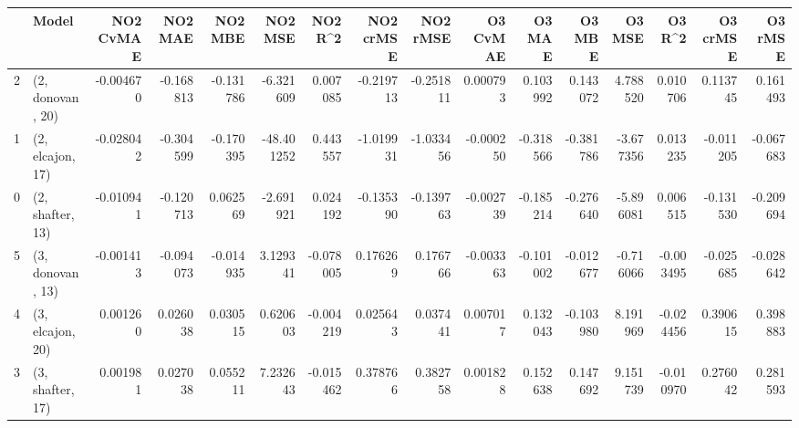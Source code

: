 \begin{tabular}{llrrrrrrrrrrrrrr}
\toprule
{} &             Model &  NO2 CvMAE &   NO2 MAE &   NO2 MBE &    NO2 MSE &   NO2 R\textasciicircum2 &  NO2 crMSE &  NO2 rMSE &  O3 CvMAE &    O3 MAE &    O3 MBE &    O3 MSE &    O3 R\textasciicircum2 &  O3 crMSE &   O3 rMSE \\
\midrule
2 &  (2, donovan, 20) &  -0.004670 & -0.168813 & -0.131786 &  -6.321609 &  0.007085 &  -0.219713 & -0.251811 &  0.000793 &  0.103992 &  0.143072 &  4.788520 &  0.010706 &  0.113745 &  0.161493 \\
1 &  (2, elcajon, 17) &  -0.028042 & -0.304599 & -0.170395 & -48.401252 &  0.443557 &  -1.019931 & -1.033456 & -0.000250 & -0.318566 & -0.381786 & -3.677356 &  0.013235 & -0.011205 & -0.067683 \\
0 &  (2, shafter, 13) &  -0.010941 & -0.120713 &  0.062569 &  -2.691921 &  0.024192 &  -0.135390 & -0.139763 & -0.002739 & -0.185214 & -0.276640 & -5.896081 &  0.006515 & -0.131530 & -0.209694 \\
5 &  (3, donovan, 13) &  -0.001413 & -0.094073 & -0.014935 &   3.129341 & -0.078005 &   0.176269 &  0.176766 & -0.003363 & -0.101002 & -0.012677 & -0.716066 & -0.003495 & -0.025685 & -0.028642 \\
4 &  (3, elcajon, 20) &   0.001260 &  0.026038 &  0.030515 &   0.620603 & -0.004219 &   0.025643 &  0.037441 &  0.007017 &  0.132043 & -0.103980 &  8.191969 & -0.024456 &  0.390615 &  0.398883 \\
3 &  (3, shafter, 17) &   0.001981 &  0.027038 &  0.055211 &   7.232643 & -0.015462 &   0.378766 &  0.382758 &  0.001828 &  0.152638 &  0.147692 &  9.151739 & -0.010970 &  0.276042 &  0.281593 \\
\bottomrule
\end{tabular}
